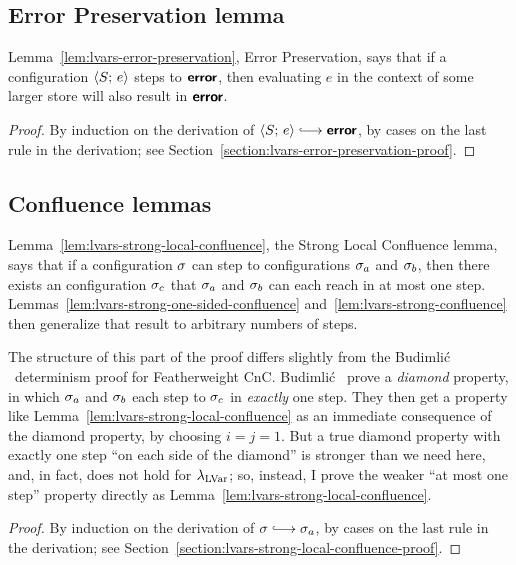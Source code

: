 \subsection{Error Preservation lemma}

Lemma~\ref{lem:lvars-error-preservation}, Error Preservation, says
that if a configuration $\langle S;\, e \rangle$ steps to $\textbf{\textsf{error}}$, then
evaluating $e$ in the context of some larger store will also result in
$\textbf{\textsf{error}}$.


\LVarsLemErrorPreservation
\begin{proof}
  By induction on the derivation of $\config{S}{e} \parstepsto
  \error$, by cases on the last rule in the derivation; see
  Section~\ref{section:lvars-error-preservation-proof}.
\end{proof}

\subsection{Confluence lemmas}\label{subsection:lvars-confluence}

Lemma~\ref{lem:lvars-strong-local-confluence}, the Strong Local
Confluence lemma, says that if a configuration $\sigma$ can step to
configurations $\sigma_a$ and $\sigma_b$, then there exists an
configuration $\sigma_c$ that $\sigma_a$ and $\sigma_b$ can each reach in
at most one step.  Lemmas~\ref{lem:lvars-strong-one-sided-confluence}
and~\ref{lem:lvars-strong-confluence} then generalize that result to
arbitrary numbers of steps.

The structure of this part of the proof differs slightly from the
Budimli\'c \etal~determinism proof for Featherweight CnC.  Budimli\'c
\etal~prove a \emph{diamond} property, in which $\sigma_a$ and
$\sigma_b$ each step to $\sigma_c$ in \emph{exactly} one step.  They
then get a property like Lemma~\ref{lem:lvars-strong-local-confluence}
as an immediate consequence of the diamond property, by choosing $i =
j = 1$.  But a true diamond property with exactly one step ``on each
side of the diamond'' is stronger than we need here, and, in fact,
does not hold for $\lambda_{\textrm{LVar}}$; so, instead, I prove the weaker ``at
most one step'' property directly as
Lemma~\ref{lem:lvars-strong-local-confluence}.

\LVarsLemStrongLocalConfluence
\begin{proof}
  By induction on the derivation of $\conf \parstepsto \conf_a$, by
  cases on the last rule in the derivation; see
  Section~\ref{section:lvars-strong-local-confluence-proof}.
\end{proof}

